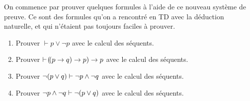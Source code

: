 \documentclass[a4paper,french,bookmarks]{article}
\begin{document}
    On commence par prouver quelques formules à l'aide de ce nouveau système de preuve. Ce sont des formules qu'on a rencontré en TD avec la déduction naturelle, et qui n'étaient pas toujours faciles à prouver.
    
    \begin{enumerate}
        \item Prouver $\vdash p \lor \neg p$ avec le calcul des séquents.
        
        
        \item Prouver $\vdash \!\left(\!\left(p \rightarrow q\right) \rightarrow p\right) \rightarrow p$ avec le calcul des séquents.
        
        
        \item Prouver $\neg\!\left(p \lor q\right) \vdash \neg p \land \neg q$ avec le calcul des séquents.
        
        
        \item Prouver $\neg p \land \neg q \vdash \neg\!\left(p \lor q\right)$ avec le calcul des séquents.
        
    \end{enumerate}
    
\end{document}
